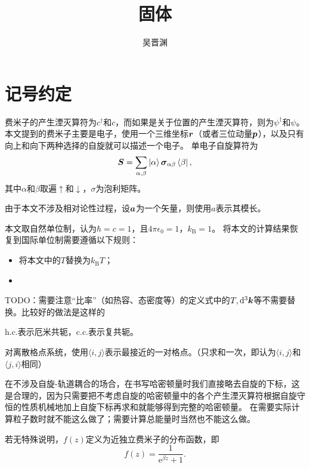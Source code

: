 \documentclass[hyperref, UTF8, a4paper]{ctexart}
\title{固体}
\author{吴晋渊}
\newcommand*{\ee}{\mathrm{e}}
\newcommand*{\pair}[1]{\langle #1 \rangle}
\numberwithin{equation}{section}
\begin{document}
\maketitle

\section*{记号约定}

费米子的产生湮灭算符为${c}^\dagger$和${c}$，而如果是关于位置的产生湮灭算符，则为${\psi}^\dagger$和${\psi}$。
本文提到的费米子主要是电子，使用一个三维坐标$\vb*{r}$（或者三位动量$\vb*{p}$），以及只有向上和向下两种选择的自旋就可以描述一个电子。
单电子自旋算符为
\[
    {\vb*{S}} = \sum_{\alpha, \beta} \ket{\alpha} \vb*{\sigma}_{\alpha \beta} \bra{\beta},
\]
其中$\alpha$和$\beta$取遍$\uparrow$和$\downarrow$，$\sigma$为泡利矩阵。

由于本文不涉及相对论性过程，设$\vb*{a}$为一个矢量，则使用$a$表示其模长。

本文取自然单位制，认为$\hbar=c=1$，且$4\pi\epsilon_0=1$，$k_\text{B}=1$。
将本文的计算结果恢复到国际单位制需要遵循以下规则：
\begin{itemize}
    \item 将本文中的$T$替换为$k_\text{B} T$；
    \item 
\end{itemize}
TODO：需要注意“比率”（如热容、态密度等）的定义式中的$T, \dd[3]{\vb*{k}}$等不需要替换。比较好的做法是这样的

$\text{h.c.}$表示厄米共轭，$\text{c.c.}$表示复共轭。

对离散格点系统，使用$\pair{i, j}$表示最接近的一对格点。（只求和一次，即认为$\pair{i, j}$和$\pair{j, i}$相同）

在不涉及自旋-轨道耦合的场合，在书写哈密顿量时我们直接略去自旋的下标，这是合理的，因为只需要把不考虑自旋的哈密顿量中的各个产生湮灭算符根据自旋守恒的性质机械地加上自旋下标再求和就能够得到完整的哈密顿量。
在需要实际计算粒子数时就不能这么做了；需要计算总能量时当然也不能这么做。

若无特殊说明，$f(z)$定义为近独立费米子的分布函数，即
\[
    f(z) = \frac{1}{\ee^{\beta z} + 1}.
\]












\end{document}
